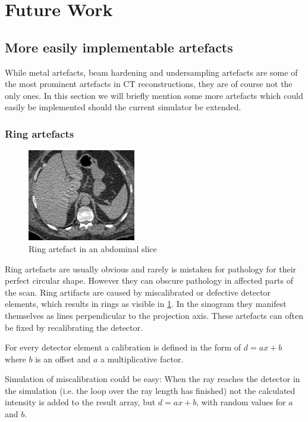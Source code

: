 \section{Future Work}
\subsection{More easily implementable artefacts}
\par While metal artefacts, beam hardening and undersampling artefacts are some of the most prominent artefacts in CT reconstructions, they are of course not the only ones. In this section we will briefly mention some more artefacts which could easily be implemented should the current simulator be extended.
\subsubsection{Ring artefacts}
\begin{figure}[h!]
	\centering
	\includegraphics[height=4cm]{images/ring.png}
	\caption{Ring artefact in an abdominal slice\cite{ringArt}}
	\label{ringArtefact}
\end{figure}
\par Ring artefacts are usually obvious and rarely is mistaken for pathology for their perfect circular shape. However they can obscure pathology in affected parts of the scan. Ring artifacts are caused by miscalibrated or defective detector elements, which results in rings as visible in \ref{ringArtefact}. In the sinogram they manifest themselves as lines perpendicular to the projection axis. These artefacts can often be fixed by recalibrating the detector.\cite{ringArt}\cite{CausesAndReductionTechniques}
\par For every detector element a calibration is defined in the form of \(d = ax+b\) where \(b\) is an offset and \(a\) a multiplicative factor.
\par Simulation of miscalibration could be easy: When the ray reaches the detector in the simulation (i.e. the loop over the ray length has finished) not the calculated intensity is added to the result array, but \(d = ax+b\), with random values for \(a\) and \(b\).

